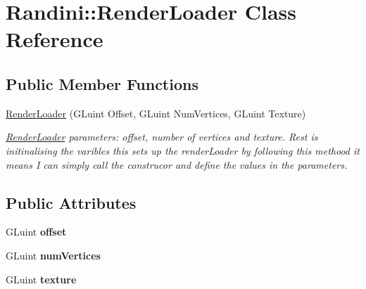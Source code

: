 \hypertarget{classRandini_1_1RenderLoader}{
\section{Randini::RenderLoader Class Reference}
\label{classRandini_1_1RenderLoader}
}
\subsection*{Public Member Functions}
\begin{DoxyCompactItemize}
\item 
\hyperlink{classRandini_1_1RenderLoader_ab6e4698f79e43ddc17780a5d6f69c3c8}{RenderLoader} (GLuint Offset, GLuint NumVertices, GLuint Texture)
\begin{DoxyCompactList}\small\item\em \hyperlink{classRandini_1_1RenderLoader}{RenderLoader} parameters: offset, number of vertices and texture. Rest is initinalising the varibles this sets up the renderLoader by following this methood it means I can simply call the construcor and define the values in the parameters. \item\end{DoxyCompactList}\end{DoxyCompactItemize}
\subsection*{Public Attributes}
\begin{DoxyCompactItemize}
\item 
\hypertarget{classRandini_1_1RenderLoader_a5eb73d19737ad1333fdec18f66f7a111}{
GLuint {\bfseries offset}}
\label{classRandini_1_1RenderLoader_a5eb73d19737ad1333fdec18f66f7a111}

\item 
\hypertarget{classRandini_1_1RenderLoader_a30bd4b7e30020ccb8c1684c25cb51451}{
GLuint {\bfseries numVertices}}
\label{classRandini_1_1RenderLoader_a30bd4b7e30020ccb8c1684c25cb51451}

\item 
\hypertarget{classRandini_1_1RenderLoader_aa7f1e320201f3b9b7e0c90799ca4b362}{
GLuint {\bfseries texture}}
\label{classRandini_1_1RenderLoader_aa7f1e320201f3b9b7e0c90799ca4b362}

\end{DoxyCompactItemize}


